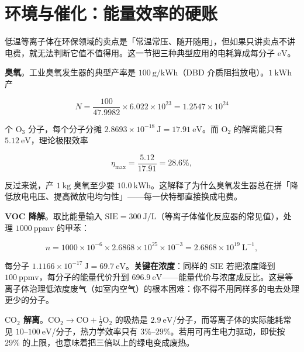 \section{环境与催化：能量效率的硬账}
\label{sec:app-p-env}

低温等离子体在环保领域的卖点是「常温常压、随开随用」，但如果只讲卖点不讲电费，就无法判断它值不值得用。这一节把三种典型应用的电耗算成每分子 $\mathrm{eV}$。

\textbf{臭氧}。工业臭氧发生器的典型产率是 $100\ \mathrm{g/kWh}$（DBD 介质阻挡放电）。$1\ \mathrm{kWh}$ 产

\begin{equation}
  N = \frac{100}{47.9982}\times6.022\times10^{23} = 1.2547\times10^{24}
  \label{eq:app-p-o3num}
\end{equation}

个 $\mathrm{O_3}$ 分子，每个分子分摊 $2.8693\times10^{-18}\ \mathrm{J} = 17.91\ \mathrm{eV}$。而 $\mathrm{O_2}$ 的解离能只有 $5.12\ \mathrm{eV}$，理论极限效率

\begin{equation}
  \eta_{\max} = \frac{5.12}{17.91} = 28.6\%,
  \label{eq:app-p-o3eff}
\end{equation}

反过来说，产 $1\ \mathrm{kg}$ 臭氧至少要 $10.0\ \mathrm{kWh}$。这解释了为什么臭氧发生器总在拼「降低放电电压、提高微放电均匀性」——每一伏特都直接换成电费。

\textbf{VOC 降解}。取比能量输入 $\mathrm{SIE} = 300\ \mathrm{J/L}$（等离子体催化反应器的常见值），处理 $1000\ \mathrm{ppmv}$ 的甲苯：

\begin{equation}
  n = 1000\times10^{-6}\times2.6868\times10^{25}\times10^{-3} = 2.6868\times10^{19}\ \mathrm{L^{-1}},
  \label{eq:app-p-vocnum}
\end{equation}

每分子 $1.1166\times10^{-17}\ \mathrm{J} = 69.7\ \mathrm{eV}$。\textbf{关键在浓度}：同样的 SIE 若把浓度降到 $100\ \mathrm{ppmv}$，每分子的能量代价升到 $696.9\ \mathrm{eV}$——能量代价与浓度成反比。这是等离子体治理低浓度废气（如室内空气）的根本困难：你不得不用同样多的电去处理更少的分子。

\textbf{$\mathrm{CO_2}$ 解离}。$\mathrm{CO_2 \to CO + \frac12 O_2}$ 的吸热是 $2.9\ \mathrm{eV}$/分子，而等离子体的实际能耗常见 $10$--$100\ \mathrm{eV}$/分子，热力学效率只有 $3\%$--$29\%$。若用可再生电力驱动，即使按 $29\%$ 的上限，也意味着把三倍以上的绿电变成废热。

